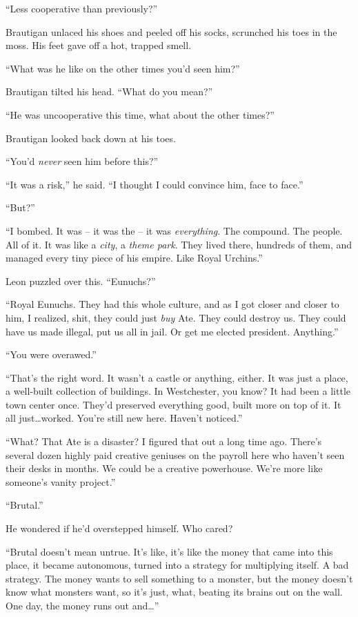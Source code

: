 “Less cooperative than previously?”

Brautigan unlaced his shoes and peeled off his socks, scrunched his 
toes in the moss. His feet gave off a hot, trapped smell.

“What was he like on the other times you'd seen him?”

Brautigan tilted his head. “What do you mean?”

“He was uncooperative this time, what about the other times?”

Brautigan looked back down at his toes.

“You'd \emph{never} seen him before this?”

“It was a risk,” he said. “I thought I could convince him, face 
to face.”

“But?”

“I bombed. It was -- it was the -- it was \emph{everything}. The 
compound. The people. All of it. It was like a \emph{city}, a 
\emph{theme park}. They lived there, hundreds of them, and managed 
every tiny piece of his empire. Like Royal Urchins.”

Leon puzzled over this. “Eunuchs?”

“Royal Eunuchs. They had this whole culture, and as I got closer and 
closer to him, I realized, shit, they could just \emph{buy} Ate. They 
could destroy us. They could have us made illegal, put us all in jail. 
Or get me elected president. Anything.”

“You were overawed.”

“That's the right word. It wasn't a castle or anything, either. It 
was just a place, a well-built collection of buildings. In Westchester, 
you know? It had been a little town center once. They'd preserved 
everything good, built more on top of it. It all just\ldots{}worked. You're 
still new here. Haven't noticed.”

“What? That Ate is a disaster? I figured that out a long time ago. 
There's several dozen highly paid creative geniuses on the payroll here 
who haven't seen their desks in months. We could be a creative 
powerhouse. We're more like someone's vanity project.”

“Brutal.”

He wondered if he'd overstepped himself. Who cared?

“Brutal doesn't mean untrue. It's like, it's like the money that came 
into this place, it became autonomous, turned into a strategy for 
multiplying itself. A bad strategy. The money wants to sell something 
to a monster, but the money doesn't know what monsters want, so it's 
just, what, beating its brains out on the wall. One day, the money runs 
out and\ldots{}”

